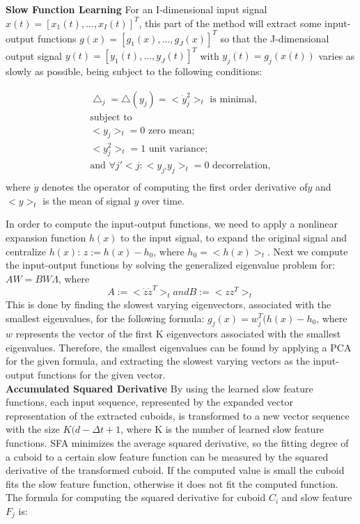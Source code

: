 \documentclass[11pt]{report}
\begin{document}
\textbf{Slow Function Learning}
For an I-dimensional input signal \\ \(x(t) = [x_1(t), ..., x_I(t)]^T \), this part of the method will extract some input-output functions \(g(x) = [g_1(x), ..., g_J(x)]^T \) so that the J-dimensional output signal \(y(t) = [y_1(t), ..., y_J(t)]^T \) with \(y_j(t) = g_j(x(t)) \) varies as slowly as possible, being subject to the following conditions:

\begin{equation}
\begin{multlined}
\bigtriangleup_j = \bigtriangleup(y_j) = <\dot{y}_j^2>_t \text{ is minimal}, \\
\text{subject to} \\
<y_j>_t = 0 \text{ zero mean}; \\
<y_j^2>_t = 1 \text{ unit variance}; \\
\text{and  } \forall j' < j : <y_{j'}y_j>_t = 0 \text{ decorrelation}, \\
\end{multlined}
\end{equation}
where \(\dot{y}\) denotes the operator of computing the first order derivative of\( y\) and \(<y>_t\) is the mean of signal \(y\) over time. 

In order to compute the input-output functions, we need to apply a nonlinear expansion function \(h(x)\) to the input signal, to expand the original signal and centralize \(h(x)\): \(z := h(x) - h_0 \), where \(h_0 = <h(x)>_t \). Next we compute the input-output functions by solving the generalized eigenvalue problem for: 
\(AW = BW\Lambda\), where \begin{equation} A := <\dot{z} \dot{z}^T>_t and  B := <zz^T>_t \end{equation} 
This is done by finding the slowest varying eigenvectors, associated with the smallest eigenvalues, for the following formula: \(g_j(x) = w_j^T(h(x) - h_0\), where \(w\) represents the vector of the first K eigenvectors associated with the smallest eigenvalues. Therefore, the smallest eigenvalues can be found by applying a PCA for the given formula, and extracting the slowest varying vectors as the input-output functions for the given vector. \\

\textbf{Accumulated Squared Derivative}
 By using the learned slow feature functions, each input sequence, represented by the expanded vector representation of the extracted cuboids, is transformed to a new vector sequence with the size \(K(d- \Delta t +1 \), where K is the number of learned slow feature functions. SFA minimizes the average squared derivative, so the fitting degree of a cuboid to a certain slow feature function can be measured by the squared derivative of the transformed cuboid. If the computed value is small the cuboid fits the slow feature function, otherwise it does not fit the computed function. The formula for computing the squared derivative for cuboid \(C_i\) and slow feature \(F_j\) is:
 
\end{document}
